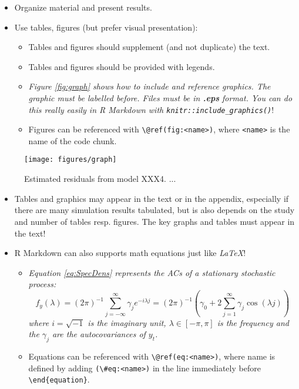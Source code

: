 \documentclass[11pt, a4paper, twosided]{book}
\begin{document}
\begin{itemize}
\item
  Organize material and present results.
\item
  Use tables, figures (but prefer visual presentation):
  \begin{itemize}
  \item
    Tables and figures should supplement (and not duplicate) the text.
  \item
    Tables and figures should be provided with legends.
  \item
    \emph{Figure \ref{fig:graph} shows how to include and reference graphics.
    The graphic must be labelled before. Files must be in \textbf{.eps} format. You
    can do this really easily in R Markdown with \texttt{knitr::include\_graphics()}}!
  \item
    Figures can be referenced with \texttt{\textbackslash{}@ref(fig:\textless{}name\textgreater{})}, where \texttt{\textless{}name\textgreater{}} is the
    name of the code chunk.
  \end{itemize}
\end{itemize}
\begin{figure}

{\centering \texttt{[image: figures/graph]} 

}

\caption{Estimated residuals from model XXX4. ...}\label{fig:graph4}
\end{figure}
\begin{itemize}
\item
  Tables and graphics may appear in the text or in the appendix, especially if
  there are many simulation results tabulated, but is also depends on the study
  and number of tables resp. figures. The key graphs and tables must appear in
  the text!
\item
  R Markdown can also supports math equations just like \emph{LaTeX}!
  \begin{itemize}
  \item
    \emph{Equation \eqref{eq:SpecDens} represents the ACs of a stationary
    stochastic process:}
    \begin{equation}
            f_y(\lambda) = (2\pi)^{-1} \sum_{j=-\infty}^{\infty}
                           \gamma_j e^{-i\lambda j}
                         =(2\pi)^{-1}\left(\gamma_0 + 2 \sum_{j=1}^{\infty}
        \gamma_j \cos(\lambda j)\right)
                                       \label{eq:SpecDens}
    \end{equation}
    \emph{where \(i=\sqrt{-1}\) is the imaginary unit, \(\lambda \in [-\pi, \pi]\) is the
    frequency and the \(\gamma_j\) are the autocovariances of \(y_t\).}
  \item
    Equations can be referenced with \texttt{\textbackslash{}@ref(eq:\textless{}name\textgreater{})}, where name is defined
    by adding \texttt{(\textbackslash{}\#eq:\textless{}name\textgreater{})} in the line immediately before \texttt{\textbackslash{}end\{equation\}}.
  \end{itemize}
\end{itemize}
\end{document}
